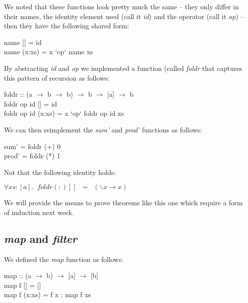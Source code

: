 \documentclass[11pt]{article}
\begin{document}
We noted that these functions look pretty much the same -- they only differ in
their names, the identity element used (call it {\em{id}}) and the operator
(call it {\it{op}}) -- then they have the following shared form:

\begin{program**}
\> name [] = id\\
\> name (x:xs) = x `op` name xs\\
\end{program**}

By abstracting {\it{id}} and {\it{op}} we implemented a function (called
{\it{foldr}} that captures this pattern of recursion as follows:

\begin{program**}
\> foldr :: (a $\rightarrow$ b $\rightarrow$ b) $\rightarrow$ b $\rightarrow$ [a] $\rightarrow$ b\\
\> foldr op id [] = id\\
\> foldr op id (x:xs) = x `op` foldr op id xs\\
\end{program**}

We can then reimplement the {\it{sum'}} and {\it{prod'}} functions as follows:

\begin{program**}
\> sum' = foldr (+) 0  \\
\> prod' = foldr (*) 1\\
\end{program**}

Not that the following identity holds:

\begin{theorem}[]
$\forall{} xs : [a].\;\; {\mathit{foldr}} (:) [] \;\;=\;\; (\backslash{}x \rightarrow{}x)$
\end{theorem}

We will provide the means to prove theorems like this one which require a form
of induction next week.

\subsection{{\it{map}} and {\it{filter}}}


We defined the {\it{map}} function as follows:

\begin{program**}
\> map :: (a $\rightarrow$ b) $\rightarrow$ [a] $\rightarrow$ [b]\\
\> map f [] = [] \\
\> map f (x:xs) = f x : map f xs\\
\end{program**}
\end{document}
